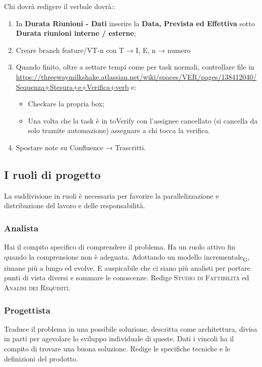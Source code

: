     	Chi dovrà redigere il verbale dovrà::
    	\begin{enumerate}
    		\item In \textbf{Durata Riunioni - Dati} inserire la \textbf{Data, Prevista ed Effettiva}  sotto \textbf{Durata riunioni interne / esterne};
    		\item Creare branch feature/VT-n con T → {I, E}, n → numero
    		\item Quando finito, oltre a settare tempi come per task normali, controllare file in \url{https://threewaymilkshake.atlassian.net/wiki/spaces/VER/pages/138412040/Sequenza+Stesura+e+Verifica+verb} e:
    		\begin{itemize}
    			\item Checkare la propria box;
    			\item Una volta che la task è in toVerify con l’assignee cancellato (si cancella da solo tramite automazione) assegnare a chi tocca la verifica.
    		\end{itemize}
    		\item Spostare note su Confluence → Trascritti.
    	\end{enumerate}

\subsection{I ruoli di progetto}
    La suddivisione in ruoli è necessaria per favorire la parallelizzazione e distribuzione del lavoro e delle responsabilità.
    \subsubsection{Analista}
    Hai il compito specifico di comprendere il problema. Ha un ruolo attivo fin quando la comprensione non è adeguata. Adottando un modello incrementale\textsubscript{G}, rimane più a lungo ed evolve. E auspicabile che ci siano più analisti per portare punti di vista diversi e sommare le conoscenze. Redige \textsc{Studio di Fattibilità} ed \textsc{Analisi dei Requisiti}.
    \subsubsection{Progettista}
    Traduce il problema in una possibile soluzione, descritta come architettura, divisa in parti per agevolare lo sviluppo individuale di queste. Dati i vincoli ha il compito di trovare una buona soluzione. Redige le specifiche tecniche e le definizioni del prodotto.
